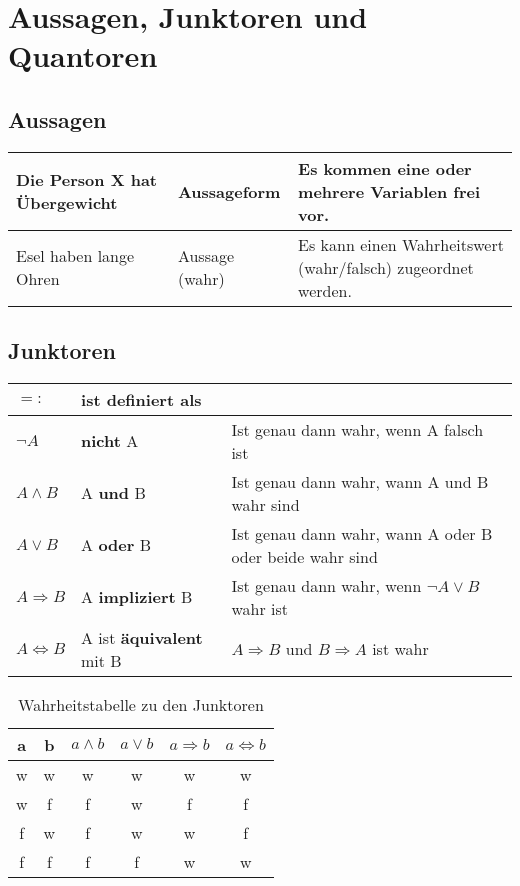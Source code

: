 \chapter{Aussagen, Junktoren und Quantoren}
\section{Aussagen}
\begin{longtable}{|p{}|p{}|p{}|}
	\hline
	Die Person X hat Übergewicht & Aussageform & Es kommen eine oder mehrere Variablen frei vor. \\
	\hline
	Esel haben lange Ohren & Aussage (wahr) & Es kann einen Wahrheitswert (wahr/falsch) zugeordnet werden. \\
	\hline
\end{longtable}

\section{Junktoren}
\begin{tabular}{|l|l|p{8.5cm}|}
	\hline
	\(=:\) & ist definiert als & ~ \\
	\hline
	\(\neg A\) & \textbf{nicht} A & Ist genau dann wahr, wenn A falsch ist \\
	\hline
	\( A \wedge B \) & A \textbf{und} B & Ist genau dann wahr, wann A und B wahr sind \\
	\hline
	\(A \vee B \) & A \textbf{oder} B & Ist genau dann wahr, wann A oder B oder beide wahr sind \\ 
	\hline
	\( A \Rightarrow B \) & A \textbf{impliziert} B & Ist genau dann wahr, wenn \(\neg A \vee B \) wahr ist \\
	\hline
	\( A \Leftrightarrow B \) & A ist \textbf{äquivalent} mit B & \(A \Rightarrow B \) und \(B \Rightarrow A \) ist wahr \\
	\hline
\end{tabular}


\begin{table}[h]
\begin{longtable}{|c|c||c|c|c|c|}
	\hline
	a & b & \(a \wedge b\) & \(a \vee b\) & \(a \Rightarrow b\) & \(a \Leftrightarrow b\) \\ \hline \hline
	w & w & w & w & w & w \\ \hline
	w & f & f & w & f & f \\ \hline
	f & w & f & w & w & f \\ \hline
	f & f & f & f & w & w \\ \hline
\end{longtable}
\caption{Wahrheitstabelle zu den Junktoren}
\end{table}

